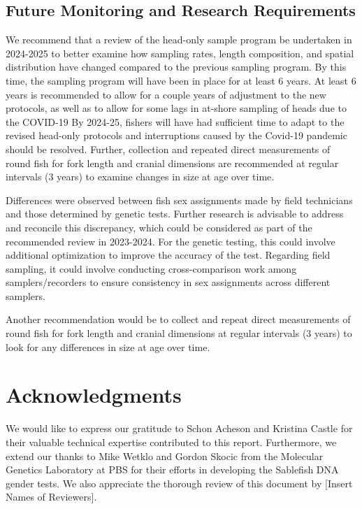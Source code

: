 \documentclass[12pt]{article}\usepackage[]{graphicx}\usepackage[]{color}
\begin{document}
\hypertarget{future-monitoring-and-research-requirements}{%
\subsection{Future Monitoring and Research Requirements}\label{future-monitoring-and-research-requirements}}

We recommend that a review of the head-only sample program be undertaken in 2024-2025 to better examine how sampling rates, length composition, and spatial distribution have changed compared to the previous sampling program. By this time, the sampling program will have been in place for at least 6 years. At least 6 years is recommended to allow for a couple years of adjustment to the new protocols, as well as to allow for some lags in at-shore sampling of heads due to the COVID-19 By 2024-25, fishers will have had sufficient time to adapt to the revised head-only protocols and interruptions caused by the Covid-19 pandemic should be resolved. Further, collection and repeated direct measurements of round fish for fork length and cranial dimensions are recommended at regular intervals (3 years) to examine changes in size at age over time.

Differences were observed between fish sex assignments made by field technicians and those determined by genetic tests. Further research is advisable to address and reconcile this discrepancy, which could be considered as part of the recommended review in 2023-2024. For the genetic testing, this could involve additional optimization to improve the accuracy of the test. Regarding field sampling, it could involve conducting cross-comparison work among samplers/recorders to ensure consistency in sex assignments across different samplers.

Another recommendation would be to collect and repeat direct measurements of round fish for fork length and cranial dimensions at regular intervals (3 years) to look for any differences in size at age over time.

\hypertarget{acknowledgments}{%
\section{Acknowledgments}\label{acknowledgments}}

We would like to express our gratitude to Schon Acheson and Kristina Castle for their valuable technical expertise contributed to this report. Furthermore, we extend our thanks to Mike Wetklo and Gordon Skocic from the Molecular Genetics Laboratory at PBS for their efforts in developing the Sablefish DNA gender tests. We also appreciate the thorough review of this document by {[}Insert Names of Reviewers{]}.
\end{document}
